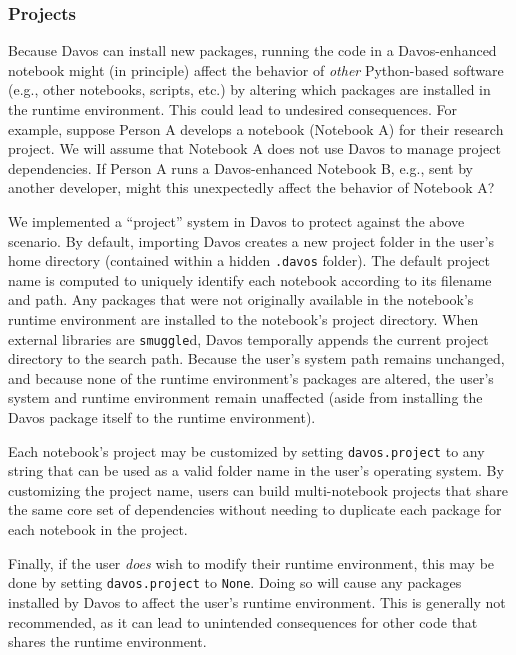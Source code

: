 \documentclass[preprint,12pt,a4paper]{elsarticle}
\begin{document}
\subsubsection{Projects}\label{subsec:projects}

Because Davos can install new packages, running the code in a
Davos-enhanced notebook might (in principle) affect the behavior of
\textit{other} Python-based software (e.g., other notebooks, scripts, etc.) by
altering which packages are installed in the runtime environment. This could
lead to undesired consequences. For example, suppose Person A develops a
notebook (Notebook A) for their research project. We will assume that Notebook
A does not use Davos to manage project dependencies.  If Person A
runs a Davos-enhanced Notebook B, e.g., sent by another developer,
might this unexpectedly affect the behavior of Notebook A?

We implemented a ``project'' system in Davos to protect against the
above scenario. By default, importing Davos creates a new project
folder in the user's home directory (contained within a hidden \texttt{.davos}
folder). The default project name is computed to uniquely identify each
notebook according to its filename and path. Any packages that were not
originally available in the notebook's runtime environment are installed to the
notebook's project directory. When external libraries are \texttt{smuggle}d,
Davos temporally appends the current project directory to the search
path. Because the user's system path remains unchanged, and because none of the
runtime environment's packages are altered, the user's system and runtime
environment remain unaffected (aside from installing the Davos package
itself to the runtime environment).

Each notebook's project may be customized by setting \texttt{davos.project} to
any string that can be used as a valid folder name in the user's operating
system. By customizing the project name, users can build multi-notebook
projects that share the same core set of dependencies without needing to
duplicate each package for each notebook in the project.

Finally, if the user \textit{does} wish to modify their runtime environment,
this may be done by setting \texttt{davos.project} to \texttt{None}. Doing so
will cause any packages installed by Davos to affect the user's
runtime environment.  This is generally not recommended, as it can lead to
unintended consequences for other code that shares the runtime environment.
\end{document}
